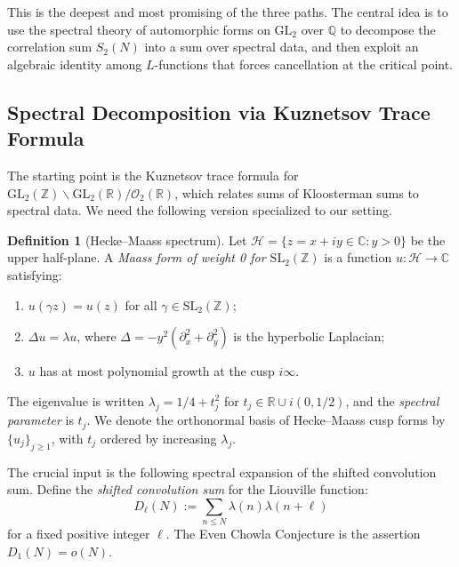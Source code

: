 \documentclass[11pt,a4paper]{article}
\theoremstyle{plain}
\theoremstyle{definition}
\newtheorem{definition}[theorem]{Definition}
\newcommand{\GL}{\mathrm{GL}}
\newcommand{\SL}{\mathrm{SL}}
\newcommand{\OO}{\mathcal{O}}
\newcommand{\CC}{\mathbb{C}}
\newcommand{\ZZ}{\mathbb{Z}}
\newcommand{\QQ}{\mathbb{Q}}
\newcommand{\RR}{\mathbb{R}}
\newcommand{\cH}{\mathcal{H}}
\begin{document}
This is the deepest and most promising of the three paths. The central idea is to use the spectral theory of automorphic forms on $\GL_2$ over $\QQ$ to decompose the correlation sum $S_2(N)$ into a sum over spectral data, and then exploit an algebraic identity among $L$-functions that forces cancellation at the critical point.

\subsection{Spectral Decomposition via Kuznetsov Trace Formula}
\label{subsec:kuznetsov}

The starting point is the Kuznetsov trace formula for $\GL_2(\ZZ) \backslash \GL_2(\RR)/\OO_2(\RR)$, which relates sums of Kloosterman sums to spectral data. We need the following version specialized to our setting.

\begin{definition}[Hecke--Maass spectrum]
\label{def:maass-spectrum}
Let $\cH = \{z = x + iy \in \CC : y > 0\}$ be the upper half-plane. A \emph{Maass form of weight 0 for $\SL_2(\ZZ)$} is a function $u: \cH \to \CC$ satisfying:
\begin{enumerate}
\item $u(\gamma z) = u(z)$ for all $\gamma \in \SL_2(\ZZ)$;
\item $\Delta u = \lambda u$, where $\Delta = -y^2(\partial_x^2 + \partial_y^2)$ is the hyperbolic Laplacian;
\item $u$ has at most polynomial growth at the cusp $i\infty$.
\end{enumerate}
The eigenvalue is written $\lambda_j = 1/4 + t_j^2$ for $t_j \in \RR \cup i(0, 1/2)$, and the \emph{spectral parameter} is $t_j$. We denote the orthonormal basis of Hecke--Maass cusp forms by $\{u_j\}_{j \geq 1}$, with $t_j$ ordered by increasing $\lambda_j$.
\end{definition}

The crucial input is the following spectral expansion of the shifted convolution sum. Define the \emph{shifted convolution sum} for the Liouville function:
\[
D_\ell(N) := \sum_{n \leq N} \lambda(n) \lambda(n+\ell)
\]
for a fixed positive integer $\ell$. The Even Chowla Conjecture is the assertion $D_1(N) = o(N)$.
\end{document}
